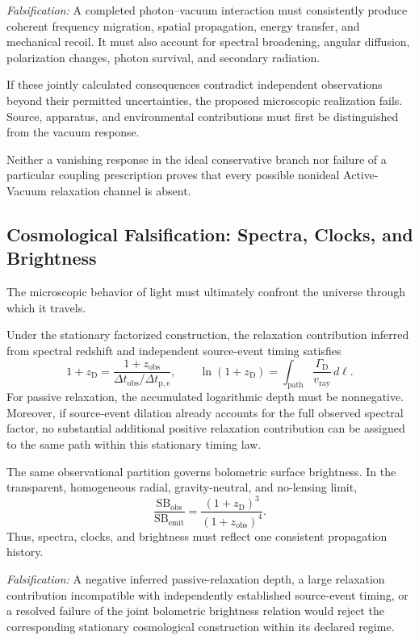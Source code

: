 \noindent\textit{Falsification:}
A completed photon--vacuum interaction must consistently
produce coherent frequency migration, spatial propagation,
energy transfer, and mechanical recoil. It must also account
for spectral broadening, angular diffusion, polarization
changes, photon survival, and secondary radiation.

If these jointly calculated consequences contradict
independent observations beyond their permitted
uncertainties, the proposed microscopic realization fails.
Source, apparatus, and environmental contributions must
first be distinguished from the vacuum response.

Neither a vanishing response in the ideal conservative
branch nor failure of a particular coupling prescription
proves that every possible nonideal Active-Vacuum
relaxation channel is absent.

\subsection{Cosmological Falsification: Spectra, Clocks, and Brightness}

The microscopic behavior of light must ultimately
confront the universe through which it travels.

Under the stationary factorized construction, the
relaxation contribution inferred from spectral redshift
and independent source-event timing satisfies
%
\[
1+z_{\mathrm D}
=
\frac{1+z_{\mathrm{obs}}}
{\Delta t_{\mathrm{obs}}/\Delta t_{\mathrm{p,e}}},
\qquad
\ln(1+z_{\mathrm D})
=
\int_{\mathrm{path}}
\frac{\Gamma_{\mathrm D}}{v_{\mathrm{ray}}}\,d\ell.
\]
%
For passive relaxation, the accumulated logarithmic
depth must be nonnegative. Moreover, if source-event
dilation already accounts for the full observed
spectral factor, no substantial additional positive
relaxation contribution can be assigned to the
same path within this stationary timing law.

The same observational partition governs bolometric
surface brightness. In the transparent, homogeneous
radial, gravity-neutral, and no-lensing limit,
%
\[
\frac{\mathrm{SB}_{\mathrm{obs}}}
{\mathrm{SB}_{\mathrm{emit}}}
=
\frac{(1+z_{\mathrm D})^3}
{(1+z_{\mathrm{obs}})^4}.
\]
%
Thus, spectra, clocks, and brightness must reflect
one consistent propagation history.

\noindent\textit{Falsification:}
A negative inferred passive-relaxation depth, a large
relaxation contribution incompatible with independently
established source-event timing, or a resolved failure
of the joint bolometric brightness relation would
reject the corresponding stationary cosmological
construction within its declared regime.

